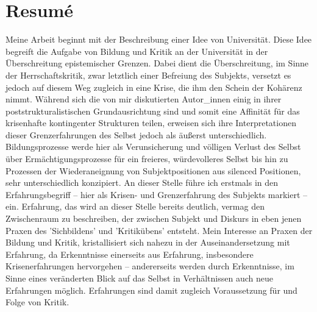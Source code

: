 \section{Resumé}

Meine Arbeit beginnt mit der Beschreibung einer Idee von Universität. Diese Idee
begreift die Aufgabe von Bildung und Kritik an der Universität in der
Überschreitung epistemischer Grenzen. Dabei dient die Überschreitung, im Sinne
der Herrschaftskritik, zwar letztlich einer Befreiung des Subjekts, versetzt es
jedoch auf diesem Weg zugleich in eine Krise, die ihm den Schein der Kohärenz
nimmt. Während sich die von mir diskutierten Autor\_innen einig in ihrer
poststrukturalistischen Grundausrichtung sind und somit eine Affinität für das
krisenhafte kontingenter Strukturen teilen, erweisen sich ihre Interpretationen
dieser Grenzerfahrungen des Selbst jedoch als äußerst unterschiedlich.
Bildungsprozesse werde hier als Verunsicherung und völligen Verlust des Selbst
über Ermächtigungsprozesse für ein freieres, würdevolleres Selbst bis hin zu
Prozessen der Wiederaneignung von Subjektpositionen aus silenced Positionen,
sehr unterschiedlich konzipiert. An dieser Stelle führe ich erstmals in den
Erfahrungsbegriff – hier als Krisen- und Grenzerfahrung des Subjekts markiert –
ein. Erfahrung, das wird an dieser Stelle bereits deutlich, vermag den
Zwischenraum zu beschreiben, der zwischen Subjekt und Diskurs in eben jenen
Praxen des 'Sichbildens' und 'Kritikübens' entsteht. Mein Interesse an Praxen
der Bildung und Kritik, kristallisiert sich nahezu in der Auseinandersetzung mit
Erfahrung, da Erkenntnisse einerseits aus Erfahrung, insbesondere
Krisenerfahrungen hervorgehen – andererseits werden durch Erkenntnisse, im Sinne
eines veränderten Blick auf das Selbst in Verhältnissen auch neue Erfahrungen
möglich. Erfahrungen sind damit zugleich Voraussetzung für und Folge von Kritik. 

